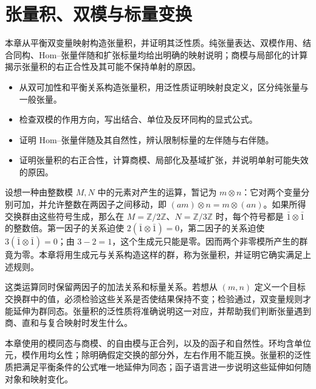 
\chapter{张量积、双模与标量变换}
\label{b2:ch:06}

\begin{chapterabstract}
	本章从平衡双变量映射构造张量积，并证明其泛性质。纯张量表达、双模作用、结合同构、Hom–张量伴随和扩张标量均给出明确的映射说明；商模与局部化的计算揭示张量积的右正合性及其可能不保持单射的原因。
\end{chapterabstract}

\begin{learninggoals}
	\begin{itemize}
		\item 从双可加性和平衡关系构造张量积，用泛性质证明映射良定义，区分纯张量与一般张量。
		\item 检查双模的作用方向，写出结合、单位及反环同构的显式公式。
		\item 证明 Hom–张量伴随及其自然性，辨认限制标量的左伴随与右伴随。
		\item 证明张量积的右正合性，计算商模、局部化及基域扩张，并说明单射可能失效的原因。
	\end{itemize}
\end{learninggoals}

设想一种由整数模 \(M,N\) 中的元素对产生的运算，暂记为 \(m\otimes n\)：它对两个变量分别可加，并允许整数在两因子之间移动，即 \((am)\otimes n=m\otimes(an)\)。如果所得交换群由这些符号生成，那么在 \(M=\mathbb Z/2\mathbb Z\)、\(N=\mathbb Z/3\mathbb Z\) 时，每个符号都是 \(\bar1\otimes\bar1\) 的整数倍。第一因子的关系迫使 \(2(\bar1\otimes\bar1)=0\)，第二因子的关系迫使 \(3(\bar1\otimes\bar1)=0\)；由 \(3-2=1\)，这个生成元只能是零。因而两个非零模所产生的群竟为零。本章将用生成元与关系构造这样的群，称为张量积，并证明它确实满足上述规则。

\ProseParagraphBreak

这类运算同时保留两因子的加法关系和标量关系。若想从 \((m,n)\) 定义一个目标交换群中的值，必须检验这些关系是否使结果保持不变；检验通过，双变量规则才能延伸为群同态。张量积的泛性质将准确说明这一对应，并帮助我们判断张量遇到商、直和与复合映射时发生什么。

\ProseParagraphBreak

本章使用的模同态与商模、的自由模与正合列，以及的函子和自然性。环均含单位元，模作用均幺性；除明确假定交换的部分外，左右作用不能互换。张量积的泛性质把满足平衡条件的公式唯一地延伸为同态；函子语言进一步说明这些延伸如何随对象和映射变化。


